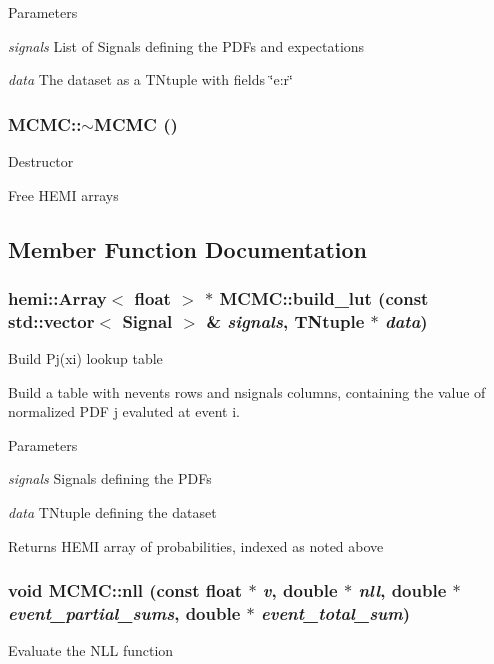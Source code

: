 \begin{DoxyParams}{Parameters}
\item[{\em signals}]List of Signals defining the PDFs and expectations \item[{\em data}]The dataset as a TNtuple with fields \char`\"{}e:r\char`\"{} \end{DoxyParams}
\hypertarget{classMCMC_a2d7d02c0892819ff5c9f91bc377d1def}{
\subsubsection[{$\sim$MCMC}]{\setlength{\rightskip}{0pt plus 5cm}MCMC::$\sim$MCMC ()}}
\label{classMCMC_a2d7d02c0892819ff5c9f91bc377d1def}
Destructor

Free HEMI arrays 

\subsection{Member Function Documentation}
\hypertarget{classMCMC_ab6a9587552fd9b23c2d13d97b791f05a}{
\subsubsection[{build\_\-lut}]{\setlength{\rightskip}{0pt plus 5cm}hemi::Array$<$ float $>$ $\ast$ MCMC::build\_\-lut (const std::vector$<$ {\bf Signal} $>$ \& {\em signals}, \/  TNtuple $\ast$ {\em data})}}
\label{classMCMC_ab6a9587552fd9b23c2d13d97b791f05a}
Build Pj(xi) lookup table

Build a table with nevents rows and nsignals columns, containing the value of normalized PDF j evaluted at event i.


\begin{DoxyParams}{Parameters}
\item[{\em signals}]Signals defining the PDFs \item[{\em data}]TNtuple defining the dataset \end{DoxyParams}
\begin{DoxyReturn}{Returns}
HEMI array of probabilities, indexed as noted above 
\end{DoxyReturn}
\hypertarget{classMCMC_a1ed0f9d2fdc8aafec039dfa023289490}{
\subsubsection[{nll}]{\setlength{\rightskip}{0pt plus 5cm}void MCMC::nll (const float $\ast$ {\em v}, \/  double $\ast$ {\em nll}, \/  double $\ast$ {\em event\_\-partial\_\-sums}, \/  double $\ast$ {\em event\_\-total\_\-sum})}}
\label{classMCMC_a1ed0f9d2fdc8aafec039dfa023289490}
Evaluate the NLL function

